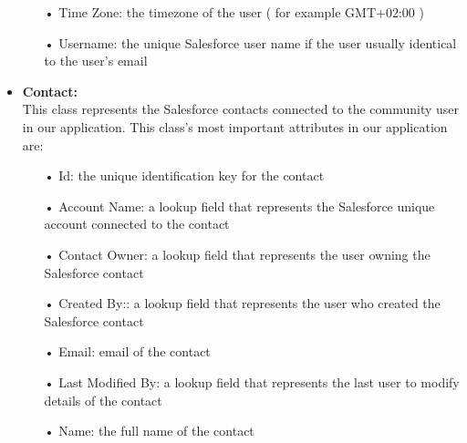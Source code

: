 \begin{itemize}
\begin{itemize}
\item[•] Time Zone: the timezone of the user ( for example GMT+02:00 )
\item[•] Username: the unique Salesforce user name if the user usually identical to the user's email
\end{itemize}
\item \textbf{Contact:}\\
This class represents the Salesforce contacts connected to the community user in our application. This class's most important attributes in our application are:
\begin{itemize}
\item[•] Id: the unique identification key for the contact 
\item[•] Account Name: a lookup field that represents the Salesforce unique account connected to the contact
\item[•] Contact Owner: a lookup field that represents the user owning the Salesforce contact
\item[•] Created By:: a lookup field that represents the user who created the Salesforce contact
\item[•] Email: email of the contact
\item[•] Last Modified By: a lookup field that represents the last user to modify details of the contact
\item[•] Name: the full name of the contact


\end{itemize}
\end{itemize}
